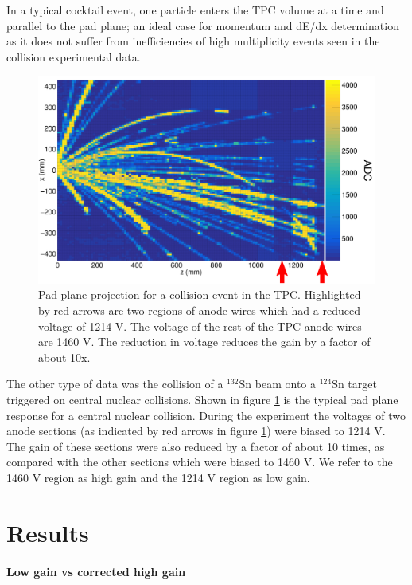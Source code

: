 \documentclass[review]{elsarticle}
\begin{document}
In a typical cocktail event, one particle enters the TPC volume at a time and parallel to the pad plane; an ideal case for momentum and dE/dx determination as it does not suffer from inefficiencies of high multiplicity events seen in the collision experimental data.  

\begin{figure}[H]
\includegraphics[width=\linewidth]{data.pdf}
\caption{Pad plane projection for a collision event in the TPC. Highlighted by red arrows are two regions of anode wires which had a reduced voltage of 1214 V. The voltage of the rest of the TPC anode wires are 1460 V. The reduction in voltage reduces the gain by a factor of about 10x. }
\label{fig:data}
\end{figure}

The other type of data was the collision of a ${}^{132}$Sn beam onto a ${}^{124}$Sn target triggered on central nuclear collisions. Shown in figure \ref{fig:data} is the typical pad plane response for a central nuclear collision. During the experiment the voltages of two anode sections (as indicated by red arrows in figure \ref{fig:data}) were biased to 1214 V. The gain of these sections were also reduced by a factor of about 10 times, as compared with the other sections which were biased to 1460 V. We refer to the 1460 V region as high gain and the 1214 V region as low gain. 


\section{Results}
\paragraph{Low gain vs corrected high gain}
\end{document}
